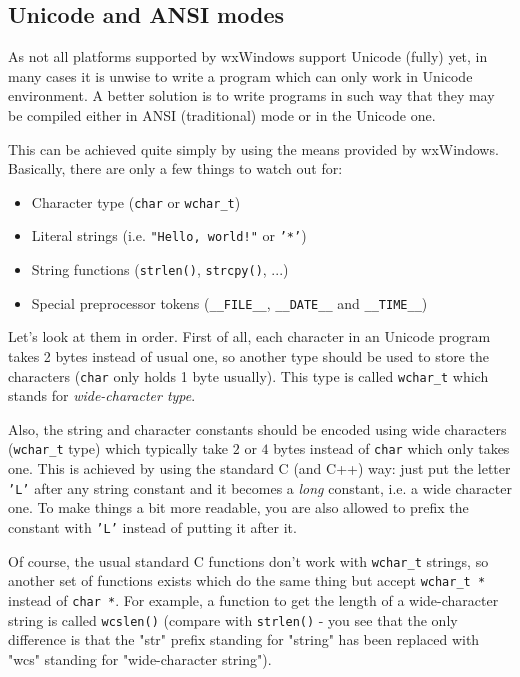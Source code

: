 \subsection{Unicode and ANSI modes}

As not all platforms supported by wxWindows support Unicode (fully) yet, in
many cases it is unwise to write a program which can only work in Unicode
environment. A better solution is to write programs in such way that they may
be compiled either in ANSI (traditional) mode or in the Unicode one.

This can be achieved quite simply by using the means provided by wxWindows.
Basically, there are only a few things to watch out for:

\begin{itemize}
\item Character type ({\tt char} or {\tt wchar\_t})
\item Literal strings (i.e. {\tt "Hello, world!"} or {\tt '*'})
\item String functions ({\tt strlen()}, {\tt strcpy()}, ...)
\item Special preprocessor tokens ({\tt \_\_FILE\_\_}, {\tt \_\_DATE\_\_} 
and {\tt \_\_TIME\_\_})
\end{itemize}

Let's look at them in order. First of all, each character in an Unicode
program takes 2 bytes instead of usual one, so another type should be used to
store the characters ({\tt char} only holds 1 byte usually). This type is
called {\tt wchar\_t} which stands for {\it wide-character type}.

Also, the string and character constants should be encoded using wide
characters ({\tt wchar\_t} type) which typically take $2$ or $4$ bytes instead
of {\tt char} which only takes one. This is achieved by using the standard C
(and C++) way: just put the letter {\tt 'L'} after any string constant and it
becomes a {\it long} constant, i.e. a wide character one. To make things a bit
more readable, you are also allowed to prefix the constant with {\tt 'L'}
instead of putting it after it.

Of course, the usual standard C functions don't work with {\tt wchar\_t}
strings, so another set of functions exists which do the same thing but accept
{\tt wchar\_t *} instead of {\tt char *}. For example, a function to get the
length of a wide-character string is called {\tt wcslen()} (compare with 
{\tt strlen()} - you see that the only difference is that the "str" prefix
standing for "string" has been replaced with "wcs" standing for "wide-character
string").

